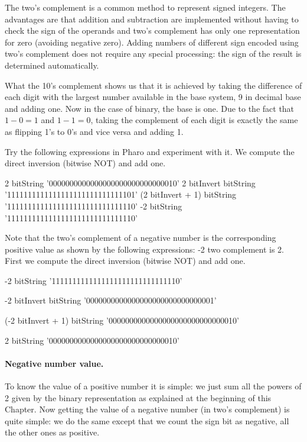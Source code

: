 \documentclass[a4paper,10pt,twoside]{book}
\begin{document}
The two's complement is a common method to represent signed integers. The advantages are that addition and subtraction are implemented without having to  check the sign of the operands and two's complement has only one representation for zero (avoiding negative zero). Adding numbers of different sign encoded using two's complement does not  require any special processing: the sign of the result is determined automatically. 

What the 10's complement shows us  that it is achieved by taking the difference of each digit with the largest number available in the base system, 9 in decimal base and adding one. Now in the case of binary, the base is one.
Due to the fact that $1 - 0 = 1$ and $1 - 1 = 0$, taking the complement of each digit is exactly the same as flipping 1's to 0's and vice versa and adding 1.


Try the following expressions in Pharo and experiment with it. We compute the direct inversion (bitwise NOT) and add one. 
\begin{code}{}
2 bitString 
			'0000000000000000000000000000010'
2 bitInvert bitString 
			'1111111111111111111111111111101'
(2 bitInvert + 1) bitString 
			'1111111111111111111111111111110'
-2 bitString 
			'1111111111111111111111111111110'		 
\end{code}

Note that the two's complement of a negative number is the corresponding positive value as shown by the following expressions: -2 two complement is 2. First we compute the direct inversion (bitwise NOT) and add one. 

\begin{code}{}
-2 bitString 
	'1111111111111111111111111111110'
	
-2 bitInvert bitString  
	'0000000000000000000000000000001'
	
(-2 bitInvert + 1) bitString   
	'0000000000000000000000000000010'

2 bitString 
	'0000000000000000000000000000010'
\end{code}

\paragraph{Negative number value.}
To know the value of a positive number it is simple: we just sum all the powers of 2 given by the binary representation as explained at the beginning of this Chapter. Now getting the value of a negative number (in two's complement) is quite simple: we do the same except that we count the sign bit as negative, all the other ones as positive. 
\end{document}

